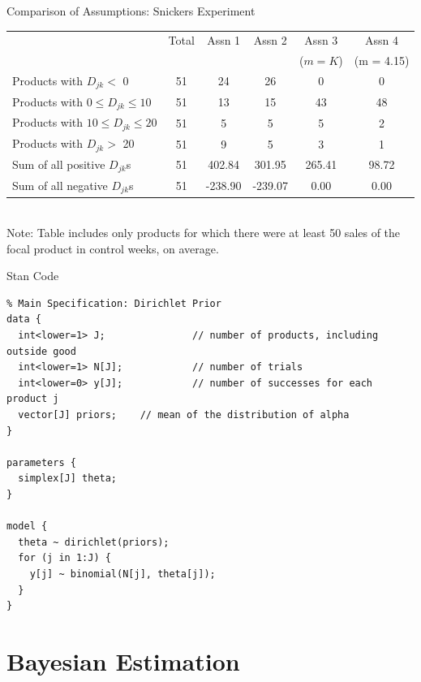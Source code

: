 \documentclass[aspectratio=169]{beamer}
\begin{document}
\begin{frame}{Comparison of Assumptions: Snickers Experiment}
\begin{table}
\footnotesize
\begin{tabular}{|l|ccccc|}
\multicolumn{1}{c}{} & \multicolumn{1}{c}{Total} & \multicolumn{1}{c}{Assn 1} & \multicolumn{1}{c}{Assn 2}   & \multicolumn{1}{c}{Assn 3} & \multicolumn{1}{c}{Assn 4} \\ 
\multicolumn{1}{c}{} 	&\multicolumn{1}{c}{} 	&\multicolumn{1}{c}{} 	&\multicolumn{1}{c}{} 	&\multicolumn{1}{c}{($m = K$)} 	&\multicolumn{1}{c}{(m = 4.15)} \\ \hline
Products with $D_{jk} < $ 0 & 51&24&26&0&0\\
Products with $0 \leq D_{jk} \leq 10$& 51&13&15&43&48\\
Products with $10 \leq D_{jk} \leq 20$ & 51&5&5&5&2\\
Products with $D_{jk} > $ 20 & 51&9&5&3&1\\ \hline
Sum of all positive $D_{jk}$s & 51&402.84&301.95&265.41&98.72\\
Sum of all negative $D_{jk}$s & 51&-238.90&-239.07&0.00&0.00\\
\hline
\end{tabular}\\
\footnotesize
Note: Table includes only products for which there were at least 50 sales of the focal product in control weeks, on average.
\end{table}
\end{frame}


\begin{frame}[fragile]{Stan Code}
\footnotesize
\begin{verbatim}
% Main Specification: Dirichlet Prior
data {
  int<lower=1> J;               // number of products, including outside good
  int<lower=1> N[J];            // number of trials
  int<lower=0> y[J];            // number of successes for each product j
  vector[J] priors;    // mean of the distribution of alpha
}

parameters {
  simplex[J] theta;
}

model {
  theta ~ dirichlet(priors);
  for (j in 1:J) {
    y[j] ~ binomial(N[j], theta[j]);
  }
}
\end{verbatim}
\end{frame}


\section{Bayesian Estimation}
\end{document}
